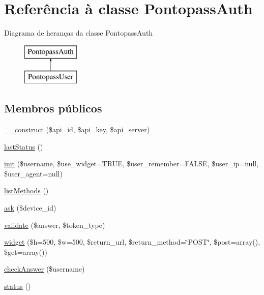 \hypertarget{classPontopassAuth}{\section{Referência à classe Pontopass\-Auth}
\label{classPontopassAuth}
}
Diagrama de heranças da classe Pontopass\-Auth\begin{figure}[H]
\begin{center}
\leavevmode
\includegraphics[height=2.000000cm]{classPontopassAuth}
\end{center}
\end{figure}
\subsection*{Membros públicos}
\begin{DoxyCompactItemize}
\item 
\hyperlink{classPontopassAuth_a5d0536d232e55faa0be69ff28548d5ea}{\-\_\-\-\_\-construct} (\$api\-\_\-id, \$api\-\_\-key, \$api\-\_\-server)
\item 
\hyperlink{classPontopassAuth_a12005841b570b001d21f6ec04bf2c42b}{last\-Status} ()
\item 
\hyperlink{classPontopassAuth_ad06637b1a81b1422fe0f7ade4b903609}{init} (\$username, \$use\-\_\-widget=T\-R\-U\-E, \$user\-\_\-remember=F\-A\-L\-S\-E, \$user\-\_\-ip=null, \$user\-\_\-agent=null)
\item 
\hyperlink{classPontopassAuth_af6e6a3a8fe54f83f5cc467a996edc830}{list\-Methods} ()
\item 
\hyperlink{classPontopassAuth_a7f65b17f3fca5e637db95d9675e96792}{ask} (\$device\-\_\-id)
\item 
\hyperlink{classPontopassAuth_ad4d35baf79f61ff2bdfc8f5767370745}{validate} (\$answer, \$token\-\_\-type)
\item 
\hyperlink{classPontopassAuth_a73eb1fb6dacf21f473f942f8e8eb5210}{widget} (\$h=500, \$w=500, \$return\-\_\-url, \$return\-\_\-method=\char`\"{}P\-O\-S\-T\char`\"{}, \$post=array(), \$get=array())
\item 
\hyperlink{classPontopassAuth_a8d1ea6eb1e30d8e9352d9bd750de1512}{check\-Answer} (\$username)
\item 
\hyperlink{classPontopassAuth_aeb5f569291b6923860bd31df480c8d6b}{status} ()
\end{DoxyCompactItemize}
